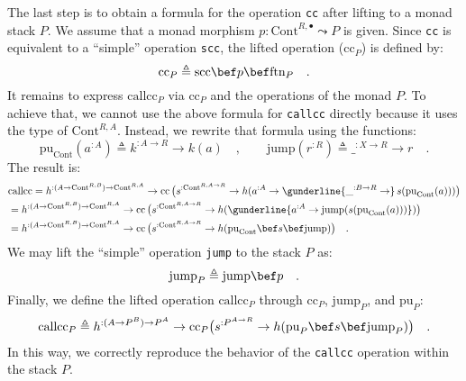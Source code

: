 The last step is to obtain a formula for the operation \lstinline!cc!
after lifting to a monad stack $P$. We assume that a monad morphism
$p:\text{Cont}^{R,\bullet}\leadsto P$ is given. Since \lstinline!cc!
is equivalent to a \textsf{``}simple\textsf{''} operation \lstinline!scc!, the lifted
operation ($\text{cc}_{P}$) is defined by:
\[
\text{cc}_{P}\triangleq\text{scc}\bef p\bef\text{ftn}_{P}\quad.
\]
It remains to express $\text{callcc}_{P}$ via $\text{cc}_{P}$ and
the operations of the monad $P$. To achieve that, we cannot use the
above formula for \lstinline!callcc! directly because it uses the
type of $\text{Cont}^{R,A}$. Instead, we rewrite that formula using
the functions:
\[
\text{pu}_{\text{Cont}}(a^{:A})\triangleq k^{:A\rightarrow R}\rightarrow k(a)\quad,\quad\quad\text{jump}(r^{:R})\triangleq\_^{:X\rightarrow R}\rightarrow r\quad.
\]
The result is:
\begin{align*}
 & \text{callcc}=h^{:(A\rightarrow\text{Cont}^{R,B})\rightarrow\text{Cont}^{R,A}}\rightarrow\text{cc}\,\big(s^{:\text{Cont}^{R,A\rightarrow R}}\rightarrow h(a^{:A}\rightarrow\gunderline{\_^{:B\rightarrow R}\rightarrow}\,s(\text{pu}_{\text{Cont}}(a)))\big)\\
 & =h^{:(A\rightarrow\text{Cont}^{R,B})\rightarrow\text{Cont}^{R,A}}\rightarrow\text{cc}\,\big(s^{:\text{Cont}^{R,A\rightarrow R}}\rightarrow h(\gunderline{a^{:A}\rightarrow\text{jump}(s(\text{pu}_{\text{Cont}}(a)))})\big)\\
 & =h^{:(A\rightarrow\text{Cont}^{R,B})\rightarrow\text{Cont}^{R,A}}\rightarrow\text{cc}\,\big(s^{:\text{Cont}^{R,A\rightarrow R}}\rightarrow h(\text{pu}_{\text{Cont}}\bef s\bef\text{jump})\big)\quad.
\end{align*}
We may lift the \textsf{``}simple\textsf{''} operation \lstinline!jump! to the stack
$P$ as:
\[
\text{jump}_{P}\triangleq\text{jump}\bef p\quad.
\]
Finally, we define the lifted operation $\text{callcc}_{P}$ through
$\text{cc}_{P}$, $\text{jump}_{P}$, and $\text{pu}_{P}$:
\[
\text{callcc}_{P}\triangleq h^{:(A\rightarrow P^{B})\rightarrow P^{A}}\rightarrow\text{cc}_{P}\big(s^{:P^{A\rightarrow R}}\rightarrow h(\text{pu}_{P}\bef s\bef\text{jump}_{P})\big)\quad.
\]
In this way, we correctly reproduce the behavior of the \lstinline!callcc!
operation within the stack $P$.

